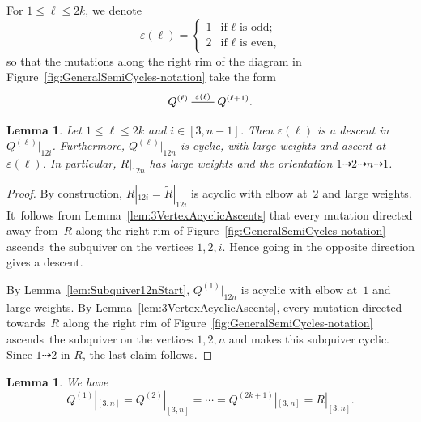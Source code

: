 \documentclass[11pt, letterpaper]{amsart}
\newtheorem{lemma}[theorem]{Lemma}
\theoremstyle{definition}
\numberwithin{equation}{section}
\newcommand{\mutation}[1]{\stackrel{#1}{\rule[.5ex]{2em}{0.5pt}}}
\newcommand{\points}{\!\dasharrow\!}
\begin{document}
For $1\le \ell\le 2k$, we denote
\begin{equation}
\label{eq:varepsilon}
\varepsilon(\ell)=
\begin{cases}
1 & \text{if $\ell$ is odd;} \\
2 & \text{if $\ell$ is even,}
\end{cases}
\end{equation}
so that the mutations along the right rim of the diagram in Figure~\ref{fig:GeneralSemiCycles-notation}
take the form
\begin{equation*}
Q^{(\ell)}\mutation{\varepsilon(\ell)}Q^{(\ell+1)}. 
\end{equation*}

\begin{lemma}
\label{lem:mut-epsilon}
Let $1\le \ell\le 2k$ and $i\!\in\! [3,n\!-\!1]$. 
Then $\varepsilon(\ell)$ is a descent in $Q^{(\ell)}|_{12i}$.
Furthermore, $Q^{(\ell)}|_{12n}$ is cyclic, with large weights and ascent at~$\varepsilon(\ell)$. 
In particular, $R|_{12n}$ has large weights and the orientation $1\points 2\points n\points 1$. 
\end{lemma}

\begin{proof}
By construction, $R|_{12i}=\tilde R|_{12i}$ is acyclic with elbow at~$2$ and large weights.
It~follows from Lemma~\ref{lem:3VertexAcyclicAscents} that every mutation %
directed away from~$R$ along the right rim of Figure~\ref{fig:GeneralSemiCycles-notation}
ascends~the subquiver on the vertices $1,2,i$. 
Hence going in the opposite direction gives a descent. 

By Lemma~\ref{lem:Subquiver12nStart}, $Q^{(1)}|_{12n}$ is acyclic with elbow at~$1$ and large weights. 
By Lemma~\ref{lem:3VertexAcyclicAscents}, every mutation %
directed towards~$R$ along the right rim of Figure~\ref{fig:GeneralSemiCycles-notation}
ascends~the subquiver on the vertices $1,2,n$ and makes this subquiver cyclic. 
Since $1 \points 2$ in $R$, the last claim follows. 
\end{proof}

\begin{lemma}
\label{lem:binRQ}
We have 
\begin{equation}
\label{eq:binRQ}
Q^{(1)}|_{[3,n]} =Q^{(2)}|_{[3,n]} = \cdots =Q^{(2k+1)}|_{[3,n]} = R|_{[3,n]}.
\end{equation}
\end{lemma}
\end{document}

